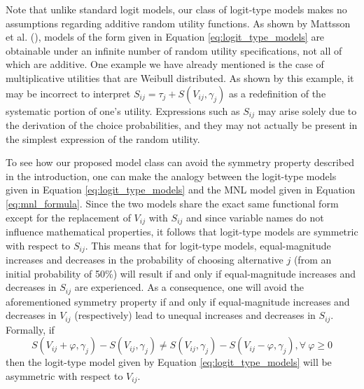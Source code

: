 Note that unlike standard logit models, our class of logit-type models makes no assumptions regarding additive random utility functions. As shown by Mattsson et al. (\citeyear{mattsson_extreme_2014}), models of the form given in Equation \ref{eq:logit_type_models} are obtainable under an infinite number of random utility specifications, not all of which are additive. One example we have already mentioned is the case of multiplicative utilities \citep{castillo_closed_2008, fosgerau_discrete_2009} that are Weibull distributed. As shown by this example, it may be incorrect to interpret $S_{ij} = \tau _j + S \left( V_{ij}, \gamma _j \right)$ as a redefinition of the systematic portion of one's utility. Expressions such as $S_{ij}$ may arise solely due to the derivation of the choice probabilities, and they may not actually be present in the simplest expression of the random utility.

To see how our proposed model class can avoid the symmetry property described in the introduction, one can make the analogy between the logit-type models given in Equation \ref{eq:logit_type_models} and the MNL model given in Equation \ref{eq:mnl_formula}. Since the two models share the exact same functional form except for the replacement of $V_{ij}$ with $S_{ij}$ and since variable names do not influence mathematical properties, it follows that logit-type models are symmetric with respect to $S_{ij}$. This means that for logit-type models, equal-magnitude increases and decreases in the probability of choosing alternative $j$ (from an initial probability of 50\%) will result if and only if equal-magnitude increases and decreases in $S_{ij}$ are experienced. As a consequence, one will avoid the aforementioned symmetry property if and only if equal-magnitude increases and decreases in $V_{ij}$ (respectively) lead to unequal increases and decreases in $S_{ij}$. Formally, if 
\begin{equation}
S \left( V_{ij} + \varphi, \gamma _j \right) - S \left( V_{ij}, \gamma _j \right) \neq S \left( V_{ij}, \gamma _j \right) - S \left( V_{ij} - \varphi, \gamma _j \right), \forall \ \varphi \geq 0
\end{equation}
then the logit-type model given by Equation \ref{eq:logit_type_models} will be asymmetric with respect to $V_{ij}$.


